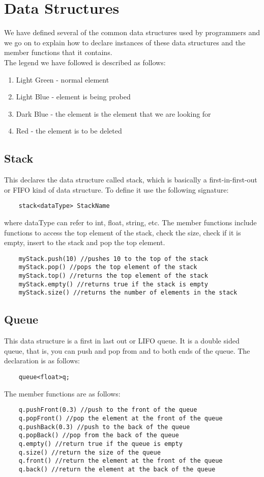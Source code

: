 \documentclass[12pt]{article}
\begin{document}
\section{Data Structures}
We have defined several of the common data structures used by programmers and we go on to explain how to declare instances of these data structures and the member functions that it contains.\\
The legend we have followed is described as follows:
\begin{enumerate}
\item Light Green - normal element
\item Light Blue - element is being probed
\item Dark Blue - the element is the element that we are looking for
\item Red - the element is to be deleted
\end{enumerate}
\subsection{Stack}
This declares the data structure called stack, which is basically a first-in-first-out or FIFO kind of data structure. To define it use the following signature:
\begin{verbatim}
    stack<dataType> StackName
\end{verbatim}
where dataType can refer to int, float, string, etc.
The member functions include functions to access the top element of the stack, check the size, check if it is empty, insert to the stack and pop the top element.
\begin{verbatim}
    myStack.push(10) //pushes 10 to the top of the stack
    myStack.pop() //pops the top element of the stack
    myStack.top() //returns the top element of the stack
    myStack.empty() //returns true if the stack is empty
    myStack.size() //returns the number of elements in the stack
\end{verbatim}

\subsection{Queue}
This data structure is a first in last out or LIFO queue. It is a double sided queue, that is, you can push and pop from and to both ends of the queue.
The declaration is as follows:
\begin{verbatim}
    queue<float>q;
\end{verbatim}
The member functions are as follows:
\begin{verbatim}
    q.pushFront(0.3) //push to the front of the queue
    q.popFront() //pop the element at the front of the queue
    q.pushBack(0.3) //push to the back of the queue
    q.popBack() //pop from the back of the queue
    q.empty() //return true if the queue is empty
    q.size() //return the size of the queue
    q.front() //return the element at the front of the queue
    q.back() //return the element at the back of the queue
\end{verbatim}
\end{document}
